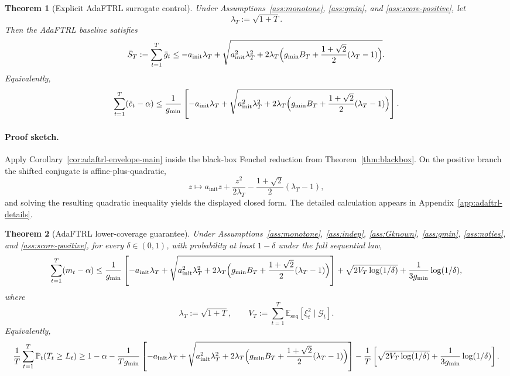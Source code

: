 \documentclass[11pt]{article}
\newtheorem{theorem}{Theorem}
\newcommand{\E}{\mathbb{E}}
\newcommand{\Prob}{\mathbb{P}}
\newcommand{\1}{\mathbf{1}}
\newcommand{\seq}{\mathrm{seq}}
\newcommand{\cG}{\mathcal{G}}
\begin{document}
\begin{theorem}[Explicit AdaFTRL surrogate control]
\label{thm:adaftrl-surrogate-main}
Under Assumptions~\ref{ass:monotone}, \ref{ass:gmin}, and \ref{ass:score-positive}, let
\[
\lambda_T:=\sqrt{1+T}.
\]
Then the AdaFTRL baseline satisfies
\[
\bar S_T:=\sum_{t=1}^T\bar g_t
\le
-a_{\mathrm{init}}\lambda_T
+
\sqrt{
a_{\mathrm{init}}^2\lambda_T^2
+
2\lambda_T\Bigl(g_{\min}B_T+\frac{1+\sqrt{2}}{2}(\lambda_T-1)\Bigr)
}.
\]
Equivalently,
\[
\sum_{t=1}^T(\hat e_t-\alpha)
\le
\frac{1}{g_{\min}}
\left[
-a_{\mathrm{init}}\lambda_T
+
\sqrt{
a_{\mathrm{init}}^2\lambda_T^2
+
2\lambda_T\Bigl(g_{\min}B_T+\frac{1+\sqrt{2}}{2}(\lambda_T-1)\Bigr)
}
\right].
\]
\end{theorem}

\paragraph{Proof sketch.}
Apply Corollary~\ref{cor:adaftrl-envelope-main} inside the black-box Fenchel reduction from Theorem~\ref{thm:blackbox}. On the positive branch the shifted conjugate is affine-plus-quadratic,
\[
z\mapsto a_{\mathrm{init}}z+\frac{z^2}{2\lambda_T}-\frac{1+\sqrt{2}}{2}(\lambda_T-1),
\]
and solving the resulting quadratic inequality yields the displayed closed form. The detailed calculation appears in Appendix~\ref{app:adaftrl-details}.

\begin{theorem}[AdaFTRL lower-coverage guarantee]
\label{thm:adaftrl-final-main}
Under Assumptions~\ref{ass:monotone}, \ref{ass:indep}, \ref{ass:Gknown}, \ref{ass:gmin}, \ref{ass:noties}, and \ref{ass:score-positive}, for every \(\delta\in(0,1)\), with probability at least \(1-\delta\) under the full sequential law,
\[
\sum_{t=1}^T (m_t-\alpha)
\le
\frac{1}{g_{\min}}
\left[
-a_{\mathrm{init}}\lambda_T
+
\sqrt{
a_{\mathrm{init}}^2\lambda_T^2
+
2\lambda_T\Bigl(g_{\min}B_T+\frac{1+\sqrt{2}}{2}(\lambda_T-1)\Bigr)
}
\right]
+
\sqrt{2V_T\log(1/\delta)}
+
\frac{1}{3g_{\min}}\log(1/\delta),
\]
where
\[
\lambda_T:=\sqrt{1+T},
\qquad
V_T:=\sum_{t=1}^T \E_{\seq}[\xi_t^2\mid \cG_t].
\]
Equivalently,
\[
\frac{1}{T}\sum_{t=1}^T \Prob_t(T_t\ge L_t)
\ge
1-\alpha
-
\frac{1}{Tg_{\min}}
\left[
-a_{\mathrm{init}}\lambda_T
+
\sqrt{
a_{\mathrm{init}}^2\lambda_T^2
+
2\lambda_T\Bigl(g_{\min}B_T+\frac{1+\sqrt{2}}{2}(\lambda_T-1)\Bigr)
}
\right]
-
\frac{1}{T}\left[
\sqrt{2V_T\log(1/\delta)}
+
\frac{1}{3g_{\min}}\log(1/\delta)
\right].
\]
\end{theorem}
\end{document}

